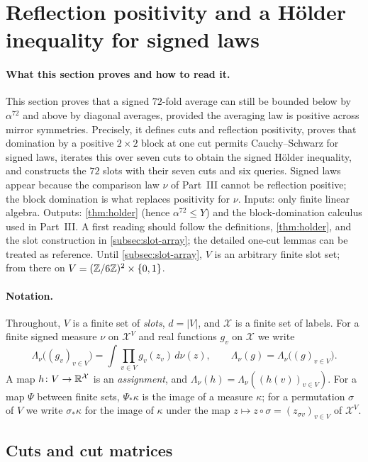 
\section{Reflection positivity and a H\"older inequality for signed laws}
\label{sec:positivity}

\paragraph{What this section proves and how to read it.}
This section proves that a signed $72$-fold average can still be
bounded below by $\alpha^{72}$ and above by diagonal averages,
provided the averaging law is positive across mirror symmetries.
Precisely, it defines cuts and reflection positivity, proves that
domination by a positive $2\times2$ block at one cut permits
Cauchy--Schwarz for signed laws, iterates this over seven cuts to
obtain the signed H\"older inequality, and constructs the $72$ slots
with their seven cuts and six queries. Signed laws appear because
the comparison law $\nu$ of Part~III cannot be reflection positive;
the block domination is what replaces positivity for $\nu$. Inputs:
only finite linear algebra. Outputs: \cref{thm:holder} (hence
$\alpha^{72}\le Y$) and the block-domination calculus used in
Part~III. A first reading should follow the definitions,
\cref{thm:holder}, and the slot construction in
\cref{subsec:slot-array}; the detailed one-cut lemmas can be treated
as reference. Until \cref{subsec:slot-array}, $V$ is an arbitrary
finite slot set; from there on $V=(\mathbb Z/6\mathbb Z)^2\times\{0,1\}$.

\paragraph{Notation.}
Throughout, $V$ is a finite set of \emph{slots}, $d=|V|$, and $\mathcal X$ is
a finite set of labels. For a finite signed measure $\nu$ on $\mathcal X^V$ and
real functions $g_v$ on $\mathcal X$ we write
\[
 \Lambda_\nu\big((g_v)_{v\in V}\big)=\int\prod_{v\in V}g_v(z_v)\,d\nu(z),
 \qquad
 \Lambda_\nu(g)=\Lambda_\nu\big((g)_{v\in V}\big).
\]
A map $h\colon V\to\mathbb R^{\mathcal X}$ is an \emph{assignment}, and
$\Lambda_\nu(h)=\Lambda_\nu((h(v))_{v\in V})$. For a map $\Psi$ between finite
sets, $\Psi_*\kappa$ is the image of a measure $\kappa$; for a permutation
$\sigma$ of $V$ we write $\sigma_*\kappa$ for the image of $\kappa$ under the
map $z\mapsto z\circ\sigma=(z_{\sigma v})_{v\in V}$ of $\mathcal X^V$.

\subsection{Cuts and cut matrices}\label{subsec:pos:cuts}

